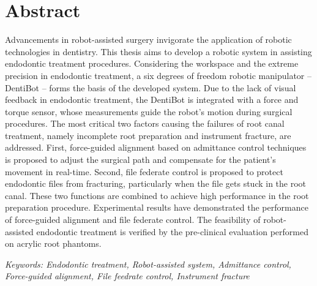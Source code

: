 \chapter{Abstract}
\label{ch:abstract}
\vspace{3mm}
\hspace*{6mm}Advancements in robot-assisted surgery invigorate the application of robotic technologies in dentistry. This thesis aims to develop a robotic system in assisting endodontic treatment procedures. Considering the workspace and the extreme precision in endodontic treatment, a six degrees of freedom robotic manipulator -- DentiBot -- forms the basis of the developed system. Due to the lack of visual feedback in endodontic treatment, the DentiBot is integrated with a force and torque sensor, whose measurements guide the robot's motion during surgical procedures. The most critical two factors causing the failures of root canal treatment, namely incomplete root preparation and instrument fracture, are addressed. First, force-guided alignment based on admittance control techniques is proposed to adjust the surgical path and compensate for the patient's movement in real-time. Second, file federate control is proposed to protect endodontic files from fracturing, particularly when the file gets stuck in the root canal. These two functions are combined to achieve high performance in the root preparation procedure. Experimental results have demonstrated the performance of force-guided alignment and file federate control. The feasibility of robot-assisted endodontic treatment is verified by the pre-clinical evaluation performed on acrylic root phantoms.
\vspace{10mm}
\par\noindent
\textit{Keywords: Endodontic treatment, Robot-assisted system, Admittance control, Force-guided alignment, File feedrate control, Instrument fracture}




